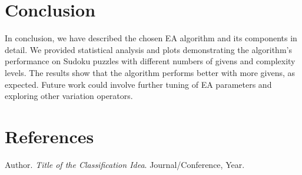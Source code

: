 \documentclass[12pt]{article}
\begin{document}
\section{Conclusion}
In conclusion, we have described the chosen 
EA algorithm and its components in detail. 
We provided statistical analysis and plots 
demonstrating the algorithm's performance on 
Sudoku puzzles with different numbers of 
givens and complexity levels. The results 
show that the algorithm performs better with 
more givens, as expected. Future work could 
involve further tuning of EA parameters and 
exploring other variation operators.

\section{References}
\begin{thebibliography}{9}
Author. 
\textit{Title of the Classification Idea}. 
Journal/Conference, Year.
\end{thebibliography}
\end{document}
